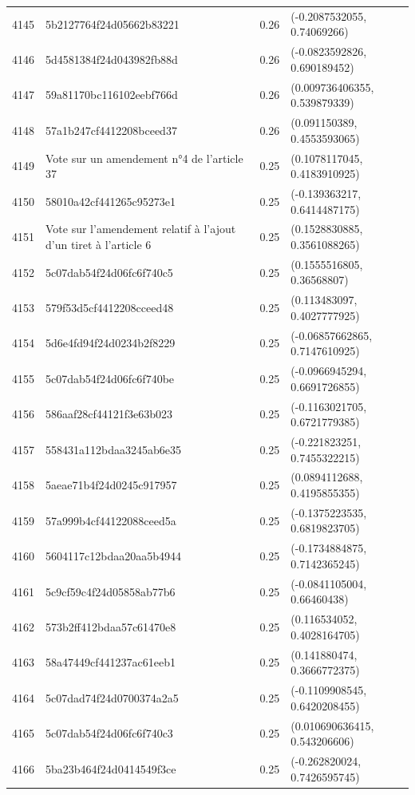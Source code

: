 \begin{table}[ht]
\begin{tabular}{rlrl}
  4145 & 5b2127764f24d05662b83221 & 0.26 & (-0.2087532055, 0.74069266) \\ 
  4146 & 5d4581384f24d043982fb88d & 0.26 & (-0.0823592826, 0.690189452) \\ 
  4147 & 59a81170bc116102eebf766d & 0.26 & (0.009736406355, 0.539879339) \\ 
  4148 & 57a1b247cf4412208bceed37 & 0.26 & (0.091150389, 0.4553593065) \\ 
  4149 & Vote sur un amendement n°4 de l'article 37 & 0.25 & (0.1078117045, 0.4183910925) \\ 
  4150 & 58010a42cf441265c95273e1 & 0.25 & (-0.139363217, 0.6414487175) \\ 
  4151 & Vote sur l'amendement relatif à l'ajout d'un tiret à l'article 6 & 0.25 & (0.1528830885, 0.3561088265) \\ 
  4152 & 5c07dab54f24d06fc6f740c5 & 0.25 & (0.1555516805, 0.36568807) \\ 
  4153 & 579f53d5cf4412208cceed48 & 0.25 & (0.113483097, 0.4027777925) \\ 
  4154 & 5d6e4fd94f24d0234b2f8229 & 0.25 & (-0.06857662865, 0.7147610925) \\ 
  4155 & 5c07dab54f24d06fc6f740be & 0.25 & (-0.0966945294, 0.6691726855) \\ 
  4156 & 586aaf28cf44121f3e63b023 & 0.25 & (-0.1163021705, 0.6721779385) \\ 
  4157 & 558431a112bdaa3245ab6e35 & 0.25 & (-0.221823251, 0.7455322215) \\ 
  4158 & 5aeae71b4f24d0245c917957 & 0.25 & (0.0894112688, 0.4195855355) \\ 
  4159 & 57a999b4cf44122088ceed5a & 0.25 & (-0.1375223535, 0.6819823705) \\ 
  4160 & 5604117c12bdaa20aa5b4944 & 0.25 & (-0.1734884875, 0.7142365245) \\ 
  4161 & 5c9cf59c4f24d05858ab77b6 & 0.25 & (-0.0841105004, 0.66460438) \\ 
  4162 & 573b2ff412bdaa57c61470e8 & 0.25 & (0.116534052, 0.4028164705) \\ 
  4163 & 58a47449cf441237ac61eeb1 & 0.25 & (0.141880474, 0.3666772375) \\ 
  4164 & 5c07dad74f24d0700374a2a5 & 0.25 & (-0.1109908545, 0.6420208455) \\ 
  4165 & 5c07dab54f24d06fc6f740c3 & 0.25 & (0.010690636415, 0.543206606) \\ 
  4166 & 5ba23b464f24d0414549f3ce & 0.25 & (-0.262820024, 0.7426595745) \\ 

\end{tabular}
\end{table}
